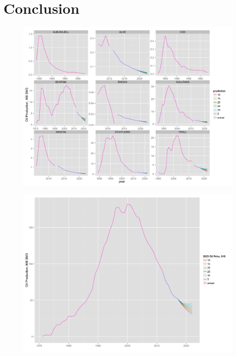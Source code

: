 \documentclass[12pt]{article}
\begin{document}
\section{Conclusion}

\begin{figure}
	\includegraphics[width=1\textwidth]{field_lev_forecast.png}
	\caption{}
	\label{field_lev_forecast}
\end{figure}

\begin{figure}
	\includegraphics[width=1\textwidth]{tot_forecast.png}
	\caption{}
	\label{tot_forecast}
\end{figure}
\end{document}
